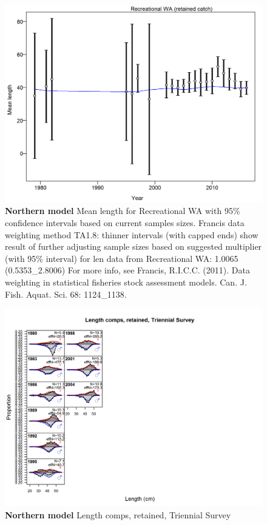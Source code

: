\documentclass[12pt,]{article}
\begin{document}
\begin{figure}[htbp]
\centering
\includegraphics{./tex2pdf.8516/44ef562dc3ffbdbbbfc6598df444b59d624b326f.png}
\caption{\textbf{Northern model} Mean length for Recreational WA with
95\% confidence intervals based on current samples sizes. Francis data
weighting method TA1.8: thinner intervals (with capped ends) show result
of further adjusting sample sizes based on suggested multiplier (with
95\% interval) for len data from Recreational WA: 1.0065
(0.5353\_2.8006) For more info, see Francis, R.I.C.C. (2011). Data
weighting in statistical fisheries stock assessment models. Can. J.
Fish. Aquat. Sci. 68: 1124\_1138.
\label{fig:mod1_21_comp_lenfit_data_weighting_TA1.8_Recreational WA}}
\end{figure}

\begin{figure}[htbp]
\centering
\includegraphics{./r4ss/plots_mod1/comp_lenfit_flt5mkt2.png}
\caption{\textbf{Northern model} Length comps, retained, Triennial
Survey \label{fig:mod1_22_comp_lenfit_flt5mkt2}}
\end{figure}
\end{document}
